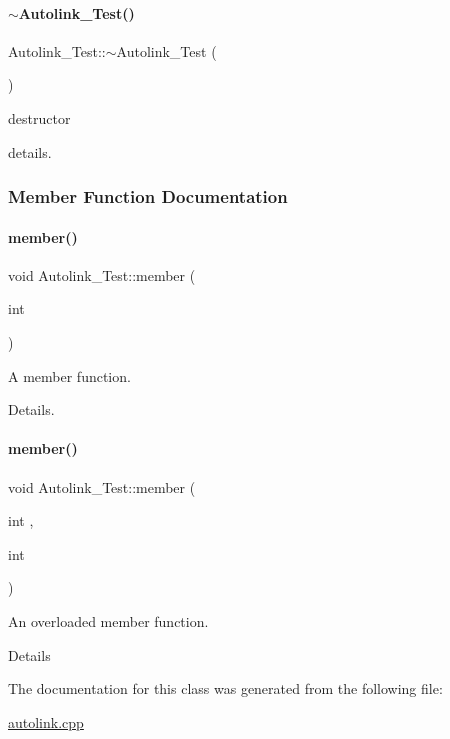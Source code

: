 \paragraph{\texorpdfstring{$\sim$\+Autolink\+\_\+\+Test()}{~Autolink\_Test()}}
{\footnotesize\ttfamily Autolink\+\_\+\+Test\+::$\sim$\+Autolink\+\_\+\+Test (\begin{DoxyParamCaption}{ }\end{DoxyParamCaption})}



destructor 

details. 

\subsubsection{Member Function Documentation}
\hypertarget{class_autolink___test_a393ea281f235a2f603d98daf72b0d411}{}\label{class_autolink___test_a393ea281f235a2f603d98daf72b0d411} 
\paragraph{\texorpdfstring{member()}{member()}\hspace{0.1cm}{\footnotesize\ttfamily [1/2]}}
{\footnotesize\ttfamily void Autolink\+\_\+\+Test\+::member (\begin{DoxyParamCaption}\item[{int}]{ }\end{DoxyParamCaption})}



A member function. 

Details. \hypertarget{class_autolink___test_acf783a43c2b4b6cc9dd2361784eca2e1}{}\label{class_autolink___test_acf783a43c2b4b6cc9dd2361784eca2e1} 
\paragraph{\texorpdfstring{member()}{member()}\hspace{0.1cm}{\footnotesize\ttfamily [2/2]}}
{\footnotesize\ttfamily void Autolink\+\_\+\+Test\+::member (\begin{DoxyParamCaption}\item[{int}]{,  }\item[{int}]{ }\end{DoxyParamCaption})}



An overloaded member function. 

Details 

The documentation for this class was generated from the following file\+:\begin{DoxyCompactItemize}
\item 
\hyperlink{autolink_8cpp}{autolink.\+cpp}\end{DoxyCompactItemize}
